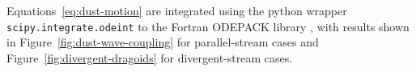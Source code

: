 Equations~\eqref{eq:dust-motion} are integrated using the python
wrapper \texttt{scipy.integrate.odeint} to the Fortran ODEPACK library
\citep{Hindmarsh:1983a, Jones:2001a}, with results shown in
Figure~\ref{fig:dust-wave-coupling} for parallel-stream cases and
Figure~\ref{fig:divergent-dragoids} for divergent-stream cases. 

